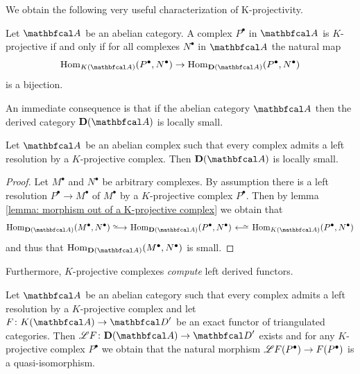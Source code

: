 We obtain the following very useful characterization of K-projectivity.
\begin{lemma}
	\label{lemma: morphism out of a K-projective complex}
	
	Let $\category{A}$ be an abelian category. A complex $P^\bullet$ in $\category{A}$ is $K$-projective if and only if for all complexes $N^\bullet$ in $\category{A}$ the natural map
	$$\Hom_\homotopyCategoryOfComplexes{\category{A}}(P^\bullet, N^\bullet) \to \Hom_\derived{\category{A}}(P^\bullet, N^\bullet)$$
	is a bijection.
\end{lemma}

An immediate consequence is that if the abelian category $\category{A}$  then the derived category $\derived{\category{A}}$ is locally small.
\begin{corollary}
	\label{corollary: local smallness of the derived category}
	
	Let $\category{A}$ be an abelian complex such that every complex admits a left resolution by a $K$-projective complex. Then $\derived{\category{A}}$ is locally small.
\end{corollary}
\begin{proof}
	Let $M^\bullet$ and $N^\bullet$ be arbitrary complexes. By assumption there is a left resolution $P^\bullet \to M^\bullet$ of $M^\bullet$ by a $K$-projective complex $P^\bullet$. Then by lemma \ref{lemma: morphism out of a K-projective complex} we obtain that
	$$\Hom_\derived{\category{A}}(M^\bullet, N^\bullet) \isorightarrow \Hom_\derived{\category{A}}(P^\bullet, N^\bullet) \isoleftarrow \Hom_\homotopyCategoryOfComplexes{\category{A}}(P^\bullet, N^\bullet)$$
	and thus that $\Hom_\derived{\category{A}}(M^\bullet, N^\bullet)$ is small.
\end{proof}

Furthermore, $K$-projective complexes \emph{compute} left derived functors.
\begin{lemma}
	\label{lemma: existence of left derived functors}
	
	Let $\category{A}$ be an abelian category such that every complex admits a left resolution by a $K$-projective complex and let $F\colon \homotopyCategoryOfComplexes{\category{A}} \to \category{D}'$ be an exact functor of triangulated categories. Then $\LeftD F\colon \derived{\category{A}} \to \category{D}'$ exists and for any $K$-projective complex $P^\bullet$ we obtain that the natural morphism $\mathscr{L} F(P^\bullet) \to F(P^\bullet)$ is a quasi-isomorphism.
\end{lemma}

